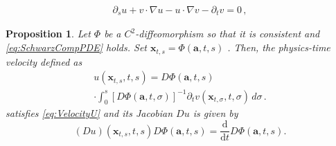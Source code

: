 \documentclass[10pt,a4paper]{amsart}
\newtheorem{proposition}{Proposition}
\newcommand{\Flow}{\Phi}
\newcommand{\bfa}{\boldsymbol{a}}
\newcommand{\bfx}{\boldsymbol{x}}
\begin{document}
\begin{align}\label{eq:SchwarzCompPDE}
        \partial_s u + v \cdot \nabla u - u \cdot \nabla v - \partial_t v = 0\,,
    \end{align}

\begin{proposition}
\label{prop:AnalyticU}
Let $\Phi$ be a $C^2$-diffeomorphism so that it is consistent and \eqref{eq:SchwarzCompPDE} holds. Set $\bfx_{t,s} = \Flow(\bfa, t, s)$ . Then, the physics-time velocity defined as
\begin{multline}
\label{eq:AnalyticUForm}
    u(\bfx_{t,s}, t, s) = D\Flow(\bfa, t, s) \\ \cdot \int_0^s \left[ D\Flow(\bfa, t, \sigma) \right ]^{-1} \partial_t v(\bfx_{t,\sigma}, t, \sigma) \, d\sigma\,.
\end{multline}
satisfies \eqref{eq:VelocityU} and its Jacobian $Du$ is given by 
\begin{equation}
    (Du)(\bfx_{t,s}, t, s) D\Flow(\bfa, t, s)  =  \frac{\mathrm d}{\mathrm d t} D\Flow(\bfa, t, s).
\end{equation}
\end{proposition}
\end{document}
